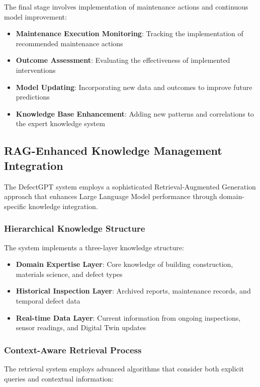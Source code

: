 The final stage involves implementation of maintenance actions and continuous model improvement:

\begin{itemize}
    \item \textbf{Maintenance Execution Monitoring}: Tracking the implementation of recommended maintenance actions
    \item \textbf{Outcome Assessment}: Evaluating the effectiveness of implemented interventions
    \item \textbf{Model Updating}: Incorporating new data and outcomes to improve future predictions
    \item \textbf{Knowledge Base Enhancement}: Adding new patterns and correlations to the expert knowledge system
\end{itemize}

\subsection{RAG-Enhanced Knowledge Management Integration}

The DefectGPT system employs a sophisticated Retrieval-Augmented Generation approach that enhances Large Language Model performance through domain-specific knowledge integration.

\subsubsection{Hierarchical Knowledge Structure}

The system implements a three-layer knowledge structure:

\begin{itemize}
    \item \textbf{Domain Expertise Layer}: Core knowledge of building construction, materials science, and defect types
    \item \textbf{Historical Inspection Layer}: Archived reports, maintenance records, and temporal defect data
    \item \textbf{Real-time Data Layer}: Current information from ongoing inspections, sensor readings, and Digital Twin updates
\end{itemize}

\subsubsection{Context-Aware Retrieval Process}

The retrieval system employs advanced algorithms that consider both explicit queries and contextual information:

